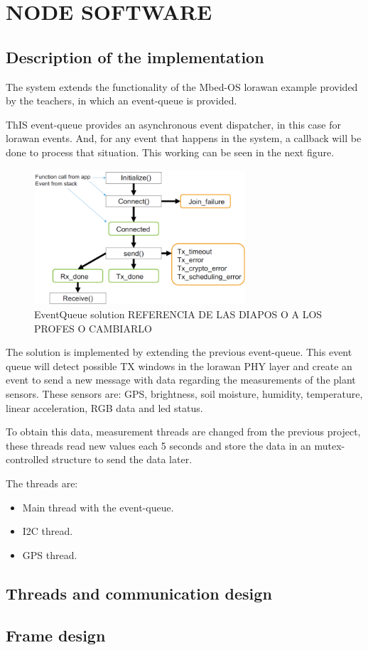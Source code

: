 \section{NODE SOFTWARE}

\subsection{Description of the implementation}

The system extends the functionality of the Mbed-OS \acrshort{lorawan} example provided by the teachers, in which an event-queue is provided.

ThIS event-queue provides an asynchronous event dispatcher, in this case for \acrshort{lorawan} events. And, for any event that happens in the system, a callback will be done to process that situation. This working can be seen in the next figure.

\begin{figure}[H]
    \centering
    \includegraphics[width=0.7\textwidth]{images/4/event-queue.png}
    \caption{EventQueue solution REFERENCIA DE LAS DIAPOS O A LOS PROFES O CAMBIARLO}
    \label{fig:events}
\end{figure}

The solution is implemented by extending the previous event-queue. This event queue will detect possible TX windows in the \acrshort{lorawan} PHY layer and create an event to send a new message with data regarding the measurements of the plant sensors. These sensors are: 
GPS, brightness, soil moisture, humidity, temperature, linear acceleration, RGB data and led status.

To obtain this data, measurement threads are changed from the previous project, these threads read new values each 5 seconds and store the data in an mutex-controlled structure to send the data later.

The threads are:
\begin{itemize}
    \item Main thread with the event-queue.
    \item I2C thread.
    \item GPS thread.
\end{itemize}
\clearpage
\subsection{Threads and communication design} %
\clearpage
\subsection{Frame design}